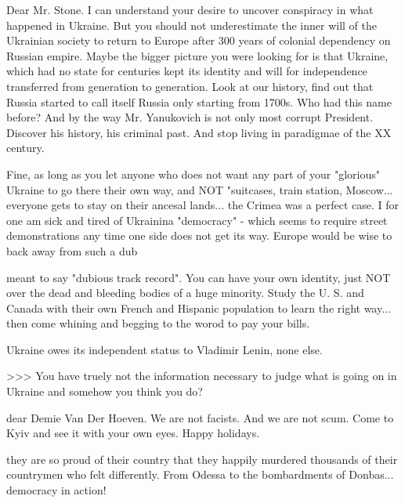 \begin{itemize}
\begin{itemize}
\end{itemize} %


Dear Mr. Stone. I can understand your desire to uncover conspiracy in what
happened in Ukraine. But you should not underestimate the inner will of the
Ukrainian society to return to Europe after 300 years of colonial dependency on
Russian empire. Maybe the bigger picture you were looking for is that Ukraine,
which had no state for centuries kept its identity and will for independence
transferred from generation to generation. Look at our history, find out that
Russia started to call itself Russia only starting from 1700s. Who had this
name before? And by the way Mr. Yanukovich is not only most corrupt President.
Discover his history, his criminal past. And stop living in paradigmae of the
XX century.

\begin{itemize} %

Fine, as long as you let anyone who does not want any part of your "glorious"
Ukraine to go there their own way, and NOT "suitcases, train station,
Moscow... everyone gets to stay on their ancesal lands... the Crimea was a
perfect case. I for one am sick and tired of Ukrainina "democracy" - which
seems to require street demonstrations any time one side does not get its way.
Europe would be wise to back away from such a dub



meant to say "dubious track record". You can have your own identity, just NOT
over the dead and bleeding bodies of a huge minority. Study the U. S. and Canada
with their own French and Hispanic population to learn the right way... then
come whining and begging to the worod to pay your bills.


Ukraine owes its independent status to Vladimir Lenin, none else.


>>> You have truely not the information necessary to judge what is going on in Ukraine
and somehow you think you do?

dear Demie Van Der Hoeven. We are not facists. And we are not scum. Come to Kyiv and see it with your own eyes. Happy holidays.


they are so proud of their country that they happily murdered thousands of
their countrymen who felt differently. From Odessa to the bombardments of
Donbas... democracy in action!


\end{itemize}
\end{itemize}
